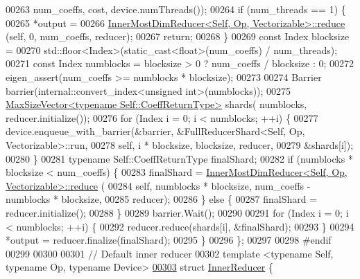 \begin{DoxyCode}
00263         num\_coeffs, cost, device.numThreads());
00264     \textcolor{keywordflow}{if} (num\_threads == 1) \{
00265       *output =
00266           \hyperlink{struct_eigen_1_1internal_1_1_inner_most_dim_reducer}{InnerMostDimReducer<Self, Op, Vectorizable>::reduce}
      (\textcolor{keyword}{self}, 0, num\_coeffs, reducer);
00267       \textcolor{keywordflow}{return};
00268     \}
00269     \textcolor{keyword}{const} Index blocksize =
00270         std::floor<Index>(\textcolor{keyword}{static\_cast<}\textcolor{keywordtype}{float}\textcolor{keyword}{>}(num\_coeffs) / num\_threads);
00271     \textcolor{keyword}{const} Index numblocks = blocksize > 0 ? num\_coeffs / blocksize : 0;
00272     eigen\_assert(num\_coeffs >= numblocks * blocksize);
00273 
00274     Barrier barrier(internal::convert\_index<unsigned int>(numblocks));
00275     \hyperlink{class_eigen_1_1_max_size_vector}{MaxSizeVector<typename Self::CoeffReturnType>} shards(
      numblocks, reducer.initialize());
00276     \textcolor{keywordflow}{for} (Index i = 0; i < numblocks; ++i) \{
00277       device.enqueue\_with\_barrier(&barrier, &FullReducerShard<Self, Op, Vectorizable>::run,
00278                                   \textcolor{keyword}{self}, i * blocksize, blocksize, reducer,
00279                                   &shards[i]);
00280     \}
00281     \textcolor{keyword}{typename} Self::CoeffReturnType finalShard;
00282     \textcolor{keywordflow}{if} (numblocks * blocksize < num\_coeffs) \{
00283       finalShard = \hyperlink{struct_eigen_1_1internal_1_1_inner_most_dim_reducer}{InnerMostDimReducer<Self, Op, Vectorizable>::reduce}
      (
00284           \textcolor{keyword}{self}, numblocks * blocksize, num\_coeffs - numblocks * blocksize,
00285           reducer);
00286     \} \textcolor{keywordflow}{else} \{
00287       finalShard = reducer.initialize();
00288     \}
00289     barrier.Wait();
00290 
00291     \textcolor{keywordflow}{for} (Index i = 0; i < numblocks; ++i) \{
00292       reducer.reduce(shards[i], &finalShard);
00293     \}
00294     *output = reducer.finalize(finalShard);
00295   \}
00296 \};
00297 
00298 \textcolor{preprocessor}{#endif}
00299 
00300 
00301 \textcolor{comment}{// Default inner reducer}
00302 \textcolor{keyword}{template} <\textcolor{keyword}{typename} Self, \textcolor{keyword}{typename} Op, \textcolor{keyword}{typename} Device>
\hyperlink{struct_eigen_1_1internal_1_1_inner_reducer}{00303} \textcolor{keyword}{struct }\hyperlink{struct_eigen_1_1internal_1_1_inner_reducer}{InnerReducer} \{

\end{DoxyCode}
